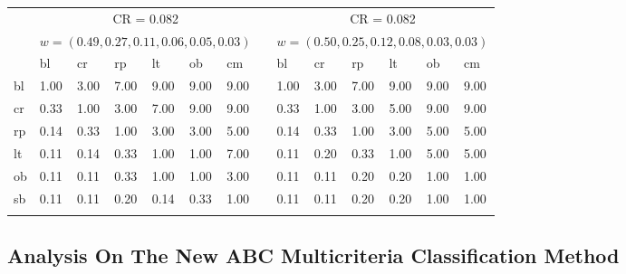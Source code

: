 \documentclass[10pt,fleqn,a4paper,twoside]{article}
\begin{document}
\begin{table}[ht]
\begin{center}
\begin{small}
\begin{tabular}[l]{p{0.4cm} p{0.5cm} p{0.5cm} p{0.5cm} p{0.5cm} p{0.5cm} p{0.5cm} p{0.1cm} | p{0.5cm} p{0.5cm} p{0.5cm} p{0.5cm} p{0.5cm} p{0.5cm}}
						\cline {1-14} \\
  						& \multicolumn{6}{c}{CR = 0.082}  & & \multicolumn{6}{c}{CR = 0.082} \\
  						& \multicolumn{6}{c}{$w=(0.49, 0.27, 0.11, 0.06, 0.05, 0.03)$} & & \multicolumn{6}{c}{$w = (0.50, 0.25, 0.12, 0.08, 0.03, 0.03)$} \\
   						& bl & cr & rp & lt & ob & cm & & bl & cr & rp & lt & ob & cm \\        
						bl & 1.00 & 3.00 & 7.00 & 9.00 & 9.00 & 9.00 & & 1.00 & 3.00 & 7.00 & 9.00 & 9.00 & 9.00 \\
						cr & 0.33 & 1.00 & 3.00 & 7.00 & 9.00 & 9.00 & & 0.33 & 1.00 & 3.00 & \cellcolor[HTML]{ACE600} 5.00 & 9.00 & 9.00 \\
						rp & 0.14 & 0.33 & 1.00 & \cellcolor[HTML]{ACE600} 3.00 & 3.00 & 5.00 & & 0.14 & 0.33 & 1.00 & \cellcolor[HTML]{ACE600} 3.00 & \cellcolor[HTML]{ACE600} 5.00 & 5.00 \\
						lt & 0.11 & 0.14 & \cellcolor[HTML]{ACE600} 0.33 & 1.00 & \cellcolor[HTML]{ACE600} 1.00 & 7.00 & & 0.11 & \cellcolor[HTML]{ACE600} 0.20 & \cellcolor[HTML]{ACE600} 0.33 & 1.00 & 5.00 & \cellcolor[HTML]{ACE600} 5.00 \\
						ob & 0.11 & 0.11 & 0.33 & \cellcolor[HTML]{ACE600} 1.00 & 1.00 & \cellcolor[HTML]{ACE600} 3.00 & & 0.11 & 0.11 & \cellcolor[HTML]{ACE600}  0.20 & 0.20 & 1.00 & 1.00 \\
						sb & 0.11 & 0.11 & 0.20 & 0.14 & \cellcolor[HTML]{ACE600} 0.33 & 1.00 & & 0.11 & 0.11 & 0.20 & \cellcolor[HTML]{ACE600} 0.20 & 1.00 & 1.00 \\
						\cline {1-14} \\
				\end{tabular} \label{tab:pairwiseMatrixAdjusted}
				\end{small}
            \end{center}
	\end{table}

\subsection{Analysis On The New ABC Multicriteria Classification Method}
\end{document}
